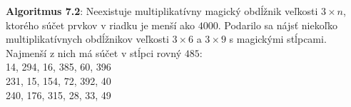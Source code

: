 \documentclass[12pt]{article}
\begin{document}
\textbf{Algoritmus 7.2}: Neexistuje multiplikatívny magický obdĺžnik veľkosti $3 \times n$, ktorého súčet prvkov v riadku je menší ako $4000$. Podarilo sa nájsť niekoľko multiplikatívnych obdĺžnikov veľkosti $3 \times 6$ a $3 \times 9$ s magickými stĺpcami. Najmenší z nich má súčet v stĺpci rovný $485$: \\
14, 294, 16, 385, 60, 396 \\
231, 15, 154, 72, 392, 40 \\
240, 176, 315, 28, 33, 49 \\
\end{document}
